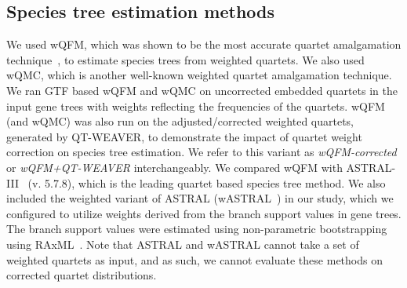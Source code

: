 \documentclass[runningheads]{llncs}
\newcommand{\add}[1]{{\color{blue} #1}}
\newcommand{\addb}[1]{{\color{red} #1}}
\begin{document}


\subsection{Species tree estimation methods}
\vspace{-3pt}
We used wQFM, \add{which was shown to be the most accurate quartet amalgamation technique~\cite{wqfm,mahbub2022qt}}, to estimate species trees from weighted quartets. We also used wQMC, which is another well-known weighted quartet amalgamation technique. %
We ran GTF based wQFM and wQMC on uncorrected embedded quartets in the input gene trees with weights reflecting the frequencies of the quartets. %
wQFM (and wQMC) was also run on the adjusted/corrected weighted quartets, generated by QT-WEAVER, to demonstrate the impact of quartet weight correction on species tree estimation. We refer to this variant as \textit{wQFM-corrected} or \textit{wQFM+QT-WEAVER} interchangeably. We compared wQFM with ASTRAL-III~\cite{astral,zhang2018astral} (v. 5.7.8), which is the leading quartet based species tree method. \add{We also included the weighted variant of ASTRAL (wASTRAL~\cite{zhang2022weighting}) in our study, which we configured to utilize weights derived from the branch support values in gene trees. The branch support values were estimated using non-parametric bootstrapping using RAxML~\cite{raxml-bootstrap}.} Note that ASTRAL \add{and wASTRAL} cannot take a set of weighted quartets as input, and as such, we cannot evaluate these methods on corrected quartet distributions.

\end{document}
